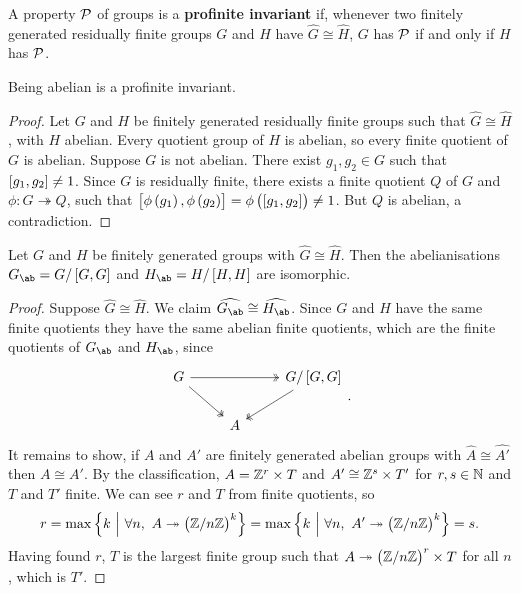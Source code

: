 
\begin{definition}
A property $ \mathcal{P} $ of groups is a \textbf{profinite invariant} if, whenever two finitely generated residually finite groups $ G $ and $ H $ have $ \widehat{G} \cong \widehat{H} $, $ G $ has $ \mathcal{P} $ if and only if $ H $ has $ \mathcal{P} $.
\end{definition}

\begin{proposition}
Being abelian is a profinite invariant.
\end{proposition}

\begin{proof}
Let $ G $ and $ H $ be finitely generated residually finite groups such that $ \widehat{G} \cong \widehat{H} $, with $ H $ abelian. Every quotient group of $ H $ is abelian, so every finite quotient of $ G $ is abelian. Suppose $ G $ is not abelian. There exist $ g_1, g_2 \in G $ such that $ \sbr{g_1, g_2} \ne 1 $. Since $ G $ is residually finite, there exists a finite quotient $ Q $ of $ G $ and $ \phi : G \twoheadrightarrow Q $, such that $ \sbr{\phi\br{g_1}, \phi\br{g_2}} = \phi\br{\sbr{g_1, g_2}} \ne 1 $. But $ Q $ is abelian, a contradiction.
\end{proof}

\pagebreak

\begin{proposition}
Let $ G $ and $ H $ be finitely generated groups with $ \widehat{G} \cong \widehat{H} $. Then the abelianisations $ G_{\ab} = G / \sbr{G, G} $ and $ H_{\ab} = H / \sbr{H, H} $ are isomorphic.
\end{proposition}

\begin{proof}
Suppose $ \widehat{G} \cong \widehat{H} $. We claim $ \widehat{G_{\ab}} \cong \widehat{H_{\ab}} $. Since $ G $ and $ H $ have the same finite quotients they have the same abelian finite quotients, which are the finite quotients of $ G_{\ab} $ and $ H_{\ab} $, since
$$
\begin{tikzcd}
G \arrow[twoheadrightarrow]{rr} \arrow[twoheadrightarrow]{dr} & & G / \sbr{G, G} \arrow[twoheadrightarrow]{dl} \\
& A &
\end{tikzcd}.
$$
It remains to show, if $ A $ and $ A' $ are finitely generated abelian groups with $ \widehat{A} \cong \widehat{A'} $ then $ A \cong A' $. By the classification, $ A = \mathbb{Z}^r \times T $ and $ A' \cong \mathbb{Z}^s \times T' $ for $ r, s \in \mathbb{N} $ and $ T $ and $ T' $ finite. We can see $ r $ and $ T $ from finite quotients, so
$$ r = \max \cbr{k \st \forall n, \ A \twoheadrightarrow \br{\ZZ / n\ZZ}^k} = \max \cbr{k \st \forall n, \ A' \twoheadrightarrow \br{\ZZ / n\ZZ}^k} = s. $$
Having found $ r $, $ T $ is the largest finite group such that $ A \twoheadrightarrow \br{\ZZ / n\ZZ}^r \times T $ for all $ n $, which is $ T' $.
\end{proof}

